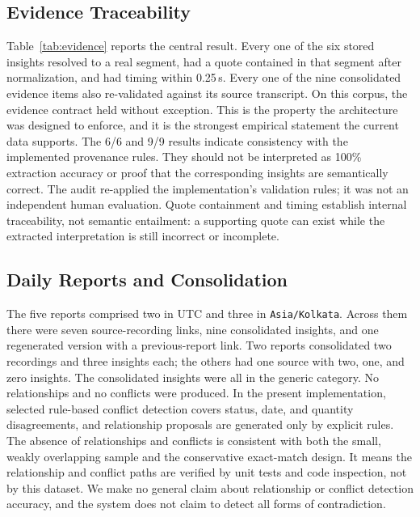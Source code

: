 \documentclass[conference,a4paper]{IEEEtran}
\newcommand{\code}[1]{\texttt{#1}}
\begin{document}
\subsection{Evidence Traceability}

Table~\ref{tab:evidence} reports the central result. Every one of the six stored insights
resolved to a real segment, had a quote contained in that segment after normalization, and
had timing within 0.25\,s. Every one of the nine consolidated evidence items also
re-validated against its source transcript. On this corpus, the evidence contract held
without exception. This is the property the architecture was designed to enforce, and it is
the strongest empirical statement the current data supports. The 6/6 and 9/9 results
indicate consistency with the implemented provenance rules. They should not be interpreted
as 100\% extraction accuracy or proof that the corresponding insights are semantically
correct. The audit re-applied the implementation's validation rules; it was not an
independent human evaluation. Quote containment and timing establish internal traceability,
not semantic entailment: a supporting quote can exist while the extracted interpretation is
still incorrect or incomplete.

\subsection{Daily Reports and Consolidation}

The five reports comprised two in UTC and three in \code{Asia/Kolkata}. Across them there
were seven source-recording links, nine consolidated insights, and one regenerated version
with a previous-report link. Two reports consolidated two recordings and three insights
each; the others had one source with two, one, and zero insights. The consolidated insights
were all in the generic category. No relationships and no conflicts were produced. In the
present implementation, selected rule-based conflict detection covers status, date, and
quantity disagreements, and relationship proposals are generated only by explicit rules.
The absence of relationships and conflicts is consistent with both the small, weakly
overlapping sample and the conservative exact-match design. It means the relationship and
conflict paths are verified by unit tests and code inspection, not by this dataset. We make
no general claim about relationship or conflict detection accuracy, and the system does not
claim to detect all forms of contradiction.
\end{document}
